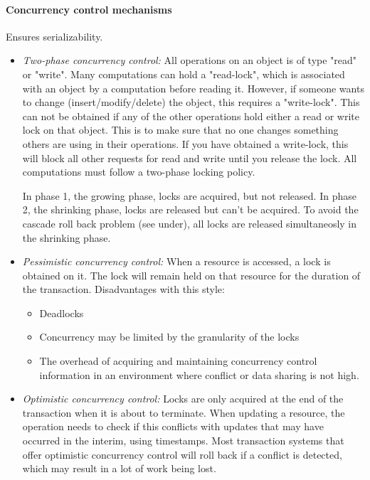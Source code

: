 \paragraph{Concurrency control mechanisms} Ensures serializability.

\begin{itemize}%
  \item \textit{Two-phase concurrency control:} All operations on an object is of type "read" or "write". Many computations can hold a "read-lock", which is associated with an object by a computation before reading it. However, if someone wants to change (insert/modify/delete) the object, this requires a "write-lock". This can not be obtained if any of the other operations hold either a read or write lock on that object. This is to make sure that no one changes something others are using in their operations. If you have obtained a write-lock, this will block all other requests for read and write until you release the lock. All computations must follow a two-phase locking policy.

  In phase 1, the growing phase, locks are acquired, but not released. In phase 2, the shrinking phase, locks are released but can't be acquired. To avoid the cascade roll back problem (see under), all locks are released simultaneosly in the shrinking phase.

  \item \textit{Pessimistic concurrency control:} When a resource is accessed, a lock is obtained on it. The lock will remain held on that resource for the duration of the transaction. Disadvantages with this style:
  \begin{itemize}[nolistsep,noitemsep]
    \item Deadlocks
    \item Concurrency may be limited by the granularity of the locks
    \item The overhead of acquiring and maintaining concurrency control information in an environment where conflict or data sharing is not high.
  \end{itemize}

  \item \textit{Optimistic concurrency control:} Locks are only acquired at the end of the transaction when it is about to terminate. When updating a resource, the operation needs to check if this conflicts with updates that may have occurred in the interim, using timestamps. Most transaction systems that offer optimistic concurrency control will roll back if a conflict is detected, which may result in a lot of work being lost.


\end{itemize}
